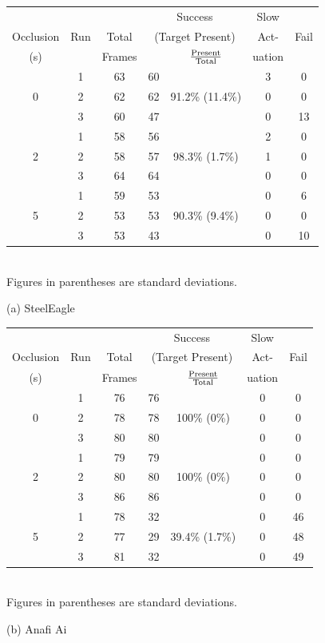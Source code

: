 \begin{table}
	\centering\small
	\begin{tabular}{|c|c|c|c|c|c|c|}
		\hline
		 &  &  & \multicolumn{2}{c|}{Success} & Slow & \\
		Occlusion & Run & Total  & \multicolumn{2}{c|}{\footnotesize (Target Present)} & Act- &  Fail\\
		\cline{5-5} 
		(s)&  &       Frames  &         & $\rm \frac{Present}{Total}$ & uation  & \\ 
		\hline
		& 1 & 63 & 60 & & 3 & 0 \\
		0 & 2 & 62 & 62 & 91.2\% \scriptsize{(11.4\%)}  & 0 & 0 \\
		& 3 & 60 & 47 & & 0 & 13\\
		\hline
		& 1 & 58 & 56 & & 2 & 0 \\
		2 & 2 & 58 & 57 & 98.3\% \scriptsize{(1.7\%)} & 1 & 0 \\
		& 3 & 64 & 64 & & 0 & 0 \\
		\hline
		& 1 & 59 & 53 & & 0 & 6 \\
		5 & 2 & 53 & 53 & 90.3\% \scriptsize{(9.4\%)} & 0 & 0  \\
		& 3 & 53 & 43 & & 0 & 10 \\
		\hline
	\end{tabular}
	\begin{captext}
		\centering \\[0.1cm] \small Figures in parentheses are standard deviations. \\
	\end{captext}
{(a) SteelEagle}\\[0.2in]

\begin{tabular}{|c|c|c|c|c|c|c|}
\hline
		 &  &  & \multicolumn{2}{c|}{Success} & Slow & \\
Occlusion & Run & Total  & \multicolumn{2}{c|}{\footnotesize (Target Present)} & Act- &  Fail\\
\cline{5-5} 
(s)&  &       Frames  &         & $\rm \frac{Present}{Total}$ & uation  & \\ 
\hline
    & 1 & 76 & 76 &    & 0 & 0 \\
0 & 2 & 78 & 78 & 100\% \scriptsize{(0\%)} & 0 & 0 \\
    & 3 & 80 & 80 &    & 0 & 0 \\
\hline
    & 1 & 79 & 79 &        & 0 & 0 \\
2 & 2 & 80 & 80 & 100\% \scriptsize{(0\%)} & 0 &  0 \\
    & 3 & 86 & 86 &        & 0 &  0 \\
\hline
    & 1 & 78 & 32 &        & 0 &  46 \\
5 & 2 & 77 & 29 & 39.4\% \scriptsize{(1.7\%)} & 0 & 48 \\
    & 3 & 81 & 32 &        & 0 &  49 \\
\hline
\end{tabular}
\begin{captext}
\centering \\[0.1cm] \small Figures in parentheses are standard deviations. \\
\end{captext}
{(b) Anafi Ai}


\end{table}
